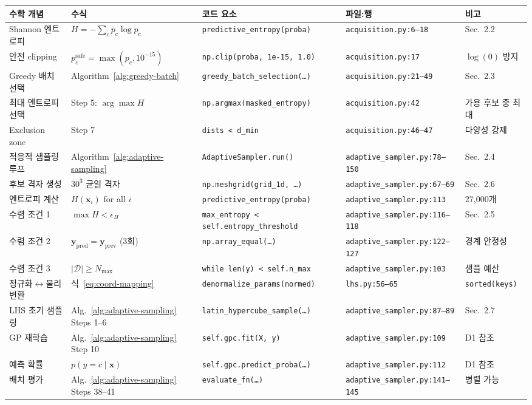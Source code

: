 \documentclass[11pt]{article}
\begin{document}
\begin{table}[htbp]
\centering
\small
\begin{tabular}{@{}lllll@{}}
\toprule
수학 개념 & 수식 & 코드 요소 & 파일:행 & 비고 \\
\midrule
Shannon 엔트로피 & $H = -\sum_c p_c \log p_c$ & \texttt{predictive\_entropy(proba)} & \texttt{acquisition.py:6--18} & Sec.~2.2 \\
안전 clipping & $p_c^{\text{safe}} = \max(p_c, 10^{-15})$ & \texttt{np.clip(proba, 1e-15, 1.0)} & \texttt{acquisition.py:17} & $\log(0)$ 방지 \\
Greedy 배치 선택 & Algorithm~\ref{alg:greedy-batch} & \texttt{greedy\_batch\_selection(\dots)} & \texttt{acquisition.py:21--49} & Sec.~2.3 \\
최대 엔트로피 선택 & Step 5: $\arg\max H$ & \texttt{np.argmax(masked\_entropy)} & \texttt{acquisition.py:42} & 가용 후보 중 최대 \\
Exclusion zone & Step 7 & \texttt{dists < d\_min} & \texttt{acquisition.py:46--47} & 다양성 강제 \\
적응적 샘플링 루프 & Algorithm~\ref{alg:adaptive-sampling} & \texttt{AdaptiveSampler.run()} & \texttt{adaptive\_sampler.py:78--150} & Sec.~2.4 \\
후보 격자 생성 & $30^3$ 균일 격자 & \texttt{np.meshgrid(grid\_1d, \dots)} & \texttt{adaptive\_sampler.py:67--69} & Sec.~2.6 \\
엔트로피 계산 & $H(\mathbf{x}_i)$ for all $i$ & \texttt{predictive\_entropy(proba)} & \texttt{adaptive\_sampler.py:113} & 27{,}000개 \\
수렴 조건 1 & $\max H < \epsilon_H$ & \texttt{max\_entropy < self.entropy\_threshold} & \texttt{adaptive\_sampler.py:116--118} & Sec.~2.5 \\
수렴 조건 2 & $\mathbf{y}_{\text{pred}} = \mathbf{y}_{\text{prev}}$ (3회) & \texttt{np.array\_equal(\dots)} & \texttt{adaptive\_sampler.py:122--127} & 경계 안정성 \\
수렴 조건 3 & $|\mathcal{D}| \geq N_{\text{max}}$ & \texttt{while len(y) < self.n\_max} & \texttt{adaptive\_sampler.py:103} & 샘플 예산 \\
정규화$\leftrightarrow$물리 변환 & 식~\eqref{eq:coord-mapping} & \texttt{denormalize\_params(normed)} & \texttt{lhs.py:56--65} & \texttt{sorted(keys)} \\
LHS 초기 샘플링 & Alg.~\ref{alg:adaptive-sampling} Steps 1--6 & \texttt{latin\_hypercube\_sample(\dots)} & \texttt{adaptive\_sampler.py:87--89} & Sec.~2.7 \\
GP 재학습 & Alg.~\ref{alg:adaptive-sampling} Step 10 & \texttt{self.gpc.fit(X, y)} & \texttt{adaptive\_sampler.py:109} & D1 참조 \\
예측 확률 & $p(y\!=\!c \mid \mathbf{x})$ & \texttt{self.gpc.predict\_proba(\dots)} & \texttt{adaptive\_sampler.py:112} & D1 참조 \\
배치 평가 & Alg.~\ref{alg:adaptive-sampling} Steps 38--41 & \texttt{evaluate\_fn(\dots)} & \texttt{adaptive\_sampler.py:141--145} & 병렬 가능 \\
\bottomrule
\end{tabular}
\end{table}
\end{document}
